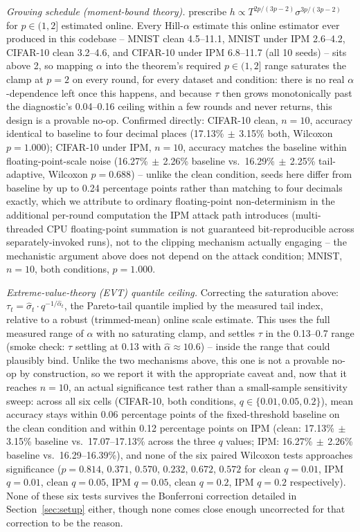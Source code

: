 \documentclass{article}
\begin{document}
\emph{Growing schedule (moment-bound theory).} \citet{sun2024gradnorm} prescribe
$h \propto T^{2p/(3p-2)} \sigma^{3p/(3p-2)}$ for $p \in (1,2]$ estimated online.
Every Hill-$\alpha$ estimate this online estimator ever produced in this codebase
-- MNIST clean 4.5--11.1, MNIST under IPM 2.6--4.2, CIFAR-10 clean 3.2--4.6, and
CIFAR-10 under IPM 6.8--11.7 (all 10 seeds) -- sits above 2, so mapping $\alpha$ into the theorem's required
$p \in (1,2]$ range
saturates the clamp at $p{=}2$ on every round, for every dataset and condition:
there is no real $\alpha$-dependence left once this happens, and because $\tau$
then grows monotonically past the diagnostic's 0.04--0.16 ceiling within a few
rounds and never returns, this design is a provable no-op. Confirmed directly:
CIFAR-10 clean, $n{=}10$, accuracy identical to baseline to four decimal places
(17.13\%$\,\pm\,$3.15\% both, Wilcoxon $p{=}1.000$); CIFAR-10 under IPM,
$n{=}10$, accuracy matches the baseline within floating-point-scale noise
(16.27\%$\,\pm\,$2.26\% baseline vs.\ 16.29\%$\,\pm\,$2.25\% tail-adaptive,
Wilcoxon $p{=}0.688$) -- unlike the clean condition, seeds here differ from
baseline by up to 0.24 percentage points rather than matching to four decimals
exactly, which we attribute to ordinary floating-point non-determinism in the
additional per-round computation the IPM attack path introduces (multi-threaded
CPU floating-point summation is not guaranteed bit-reproducible across
separately-invoked runs), not to the clipping mechanism actually engaging --
the mechanistic argument above does not depend on the attack condition; MNIST,
$n{=}10$, both conditions, $p{=}1.000$.

\emph{Extreme-value-theory (EVT) quantile ceiling.} Correcting the saturation
above: $\tau_t = \hat\sigma_t \cdot q^{-1/\hat\alpha_t}$, the Pareto-tail quantile
implied by the measured tail index, relative to a robust (trimmed-mean) online
scale estimate. This uses the full measured range of $\alpha$ with no saturating
clamp, and settles $\tau$ in the 0.13--0.7 range (smoke check: $\tau$ settling at
0.13 with $\hat\alpha{\approx}10.6$) -- inside the range that could plausibly
bind. Unlike the two mechanisms above, this one is not a provable no-op by
construction, so we report it with the appropriate caveat and, now that it
reaches $n{=}10$, an actual significance test rather than a small-sample
sensitivity sweep: across all six cells (CIFAR-10, both conditions, $q \in
\{0.01, 0.05, 0.2\}$), mean accuracy stays within 0.06 percentage points of the
fixed-threshold baseline on the clean condition and within 0.12 percentage
points on IPM (clean: 17.13\%$\,\pm\,$3.15\% baseline vs.\
17.07--17.13\% across the three $q$ values; IPM: 16.27\%$\,\pm\,$2.26\%
baseline vs.\ 16.29--16.39\%), and none of the six paired Wilcoxon tests
approaches significance ($p{=}0.814$, $0.371$, $0.570$, $0.232$, $0.672$,
$0.572$ for clean $q{=}0.01$, IPM $q{=}0.01$, clean $q{=}0.05$, IPM $q{=}0.05$,
clean $q{=}0.2$, IPM $q{=}0.2$ respectively). None of these six tests survives
the Bonferroni correction detailed in Section~\ref{sec:setup} either, though
none comes close enough uncorrected for that correction to be the reason.
\end{document}
